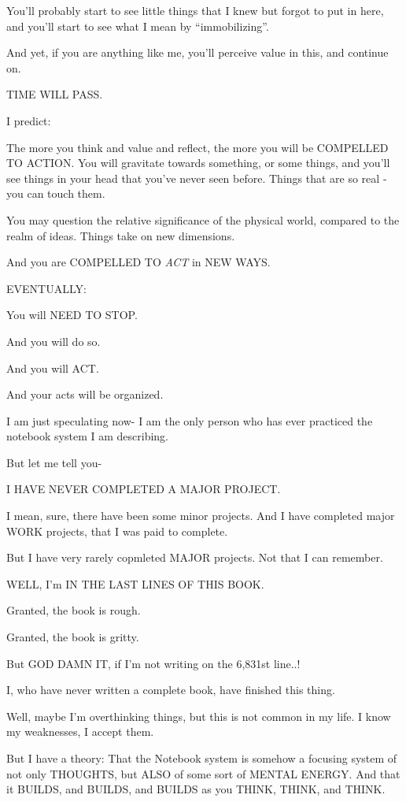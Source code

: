\documentclass[oneside]{book}
\begin{document}
You'll probably start to see little things that I knew but forgot to
put in here, and you'll start to see what I mean by ``immobilizing''.

And yet, if you are anything like me, you'll perceive value in this,
and continue on.

TIME WILL PASS.

I predict:

The more you think and value and reflect, the more you will be
COMPELLED TO ACTION. You will gravitate towards something, or some
things, and you'll see things in your head that you've never seen
before. Things that are so real - you can touch them.

You may question the relative significance of the physical world,
compared to the realm of ideas. Things take on new dimensions.

And you are COMPELLED TO \emph{ACT} in NEW WAYS.

EVENTUALLY:

You will NEED TO STOP.

And you will do so.

And you will ACT.

And your acts will be organized.


I am just speculating now- I am the only person who has ever practiced
the notebook system I am describing.

But let me tell you-

I HAVE NEVER COMPLETED A MAJOR PROJECT.

I mean, sure, there have been some minor projects. And I have
completed major WORK projects, that I was paid to complete.

But I have very rarely copmleted MAJOR projects. Not that I can
remember.

WELL, I'm IN THE LAST LINES OF THIS BOOK.

Granted, the book is rough.

Granted, the book is gritty.

But GOD DAMN IT, if I'm not writing on the 6,831st line..!

I, who have never written a complete book, have finished this thing.

Well, maybe I'm overthinking things, but this is not common in my
life. I know my weaknesses, I accept them.

But I have a theory: That the Notebook system is somehow a focusing
system of not only THOUGHTS, but ALSO of some sort of MENTAL
ENERGY. And that it BUILDS, and BUILDS, and BUILDS as you THINK,
THINK, and THINK.
\end{document}
